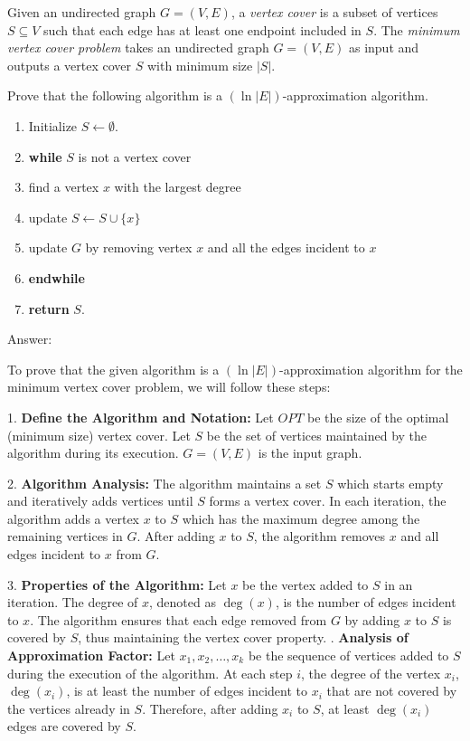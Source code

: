 \documentclass{oxmathproblems}
\begin{document}
\begin{questions}
\miquestion[25] 
Given an undirected graph $G=(V,E)$, a \emph{vertex cover} is a subset of vertices $S\subseteq V$ such that each edge has at least one endpoint included in $S$.
The \emph{minimum vertex cover problem} takes an undirected graph $G=(V,E)$ as input and outputs a vertex cover $S$ with minimum size $|S|$.

Prove that the following algorithm is a $(\ln|E|)$-approximation algorithm.
\begin{enumerate}
    \item Initialize $S\leftarrow \emptyset$.
    \item \textbf{while} $S$ is not a vertex cover
    \item \hspace{0.5cm} find a vertex $x$ with the largest degree
    \item \hspace{0.5cm} update $S\leftarrow S\cup\{x\}$
    \item \hspace{0.5cm} update $G$ by removing vertex $x$ and all the edges incident to $x$
    \item \textbf{endwhile}
    \item \textbf{return} $S$.
\end{enumerate}

Answer:

To prove that the given algorithm is a $(\ln |E|)$-approximation algorithm for the minimum vertex cover problem, we will follow these steps:

1. \textbf{Define the Algorithm and Notation:}
   Let $OPT$ be the size of the optimal (minimum size) vertex cover.
   Let $S$ be the set of vertices maintained by the algorithm during its execution.
   $G = (V, E)$ is the input graph.

2. \textbf{Algorithm Analysis:}
   The algorithm maintains a set $S$ which starts empty and iteratively adds vertices until $S$ forms a vertex cover.
   In each iteration, the algorithm adds a vertex $x$ to $S$ which has the maximum degree among the remaining vertices in $G$.
   After adding $x$ to $S$, the algorithm removes $x$ and all edges incident to $x$ from $G$. 

3. \textbf{Properties of the Algorithm:}
   Let $x$ be the vertex added to $S$ in an iteration. The degree of $x$, denoted as $\deg(x)$, is the number of edges incident to $x$.
   The algorithm ensures that each edge removed from $G$ by adding $x$ to $S$ is covered by $S$, thus maintaining the vertex cover property.
. \textbf{Analysis of Approximation Factor:}
   Let $x_1, x_2, \ldots, x_k$ be the sequence of vertices added to $S$ during the execution of the algorithm.
   At each step $i$, the degree of the vertex $x_i$, $\deg(x_i)$, is at least the number of edges incident to $x_i$ that are not covered by the vertices already in $S$.
   Therefore, after adding $x_i$ to $S$, at least $\deg(x_i)$ edges are covered by $S$.


\end{questions}
\end{document}
